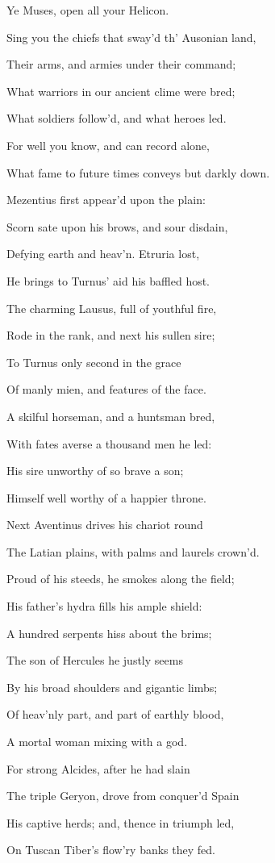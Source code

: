 Ye Muses, open all your Helicon.

Sing you the chiefs that sway’d th’ Ausonian land,

Their arms, and armies under their command;

What warriors in our ancient clime were bred;

What soldiers follow’d, and what heroes led.

For well you know, and can record alone,

What fame to future times conveys but darkly down.

Mezentius first appear’d upon the plain:

Scorn sate upon his brows, and sour disdain,

Defying earth and heav’n. Etruria lost,

He brings to Turnus’ aid his baffled host.

The charming Lausus, full of youthful fire,

Rode in the rank, and next his sullen sire;

To Turnus only second in the grace

Of manly mien, and features of the face.

A skilful horseman, and a huntsman bred,

With fates averse a thousand men he led:

His sire unworthy of so brave a son;

Himself well worthy of a happier throne.

Next Aventinus drives his chariot round

The Latian plains, with palms and laurels crown’d.

Proud of his steeds, he smokes along the field;

His father’s hydra fills his ample shield:

A hundred serpents hiss about the brims;

The son of Hercules he justly seems

By his broad shoulders and gigantic limbs;

Of heav’nly part, and part of earthly blood,

A mortal woman mixing with a god.

For strong Alcides, after he had slain

The triple Geryon, drove from conquer’d Spain

His captive herds; and, thence in triumph led,

On Tuscan Tiber’s flow’ry banks they fed.

